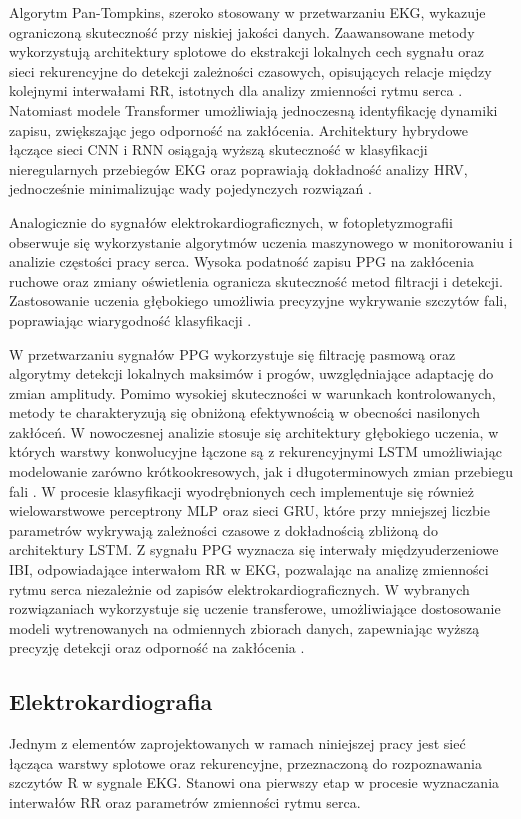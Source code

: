 \documentclass[journal]{IEEEtran}
\begin{document}
Algorytm Pan-Tompkins, szeroko stosowany w przetwarzaniu EKG, wykazuje ograniczoną skuteczność przy niskiej jakości danych. Zaawansowane metody wykorzystują architektury splotowe do ekstrakcji lokalnych cech sygnału oraz sieci rekurencyjne do detekcji zależności czasowych, opisujących relacje między kolejnymi interwałami RR, istotnych dla analizy zmienności rytmu serca \cite{2}. Natomiast modele Transformer umożliwiają jednoczesną identyfikację dynamiki zapisu, zwiększając jego odporność na zakłócenia.  Architektury hybrydowe łączące sieci CNN i RNN osiągają wyższą skuteczność w klasyfikacji nieregularnych przebiegów EKG oraz poprawiają dokładność analizy HRV, jednocześnie minimalizując wady pojedynczych rozwiązań \cite{3}.

\newpage
Analogicznie do sygnałów elektrokardiograficznych, w fotopletyzmografii obserwuje się wykorzystanie algorytmów uczenia maszynowego w monitorowaniu i analizie częstości pracy serca. Wysoka podatność zapisu PPG na zakłócenia ruchowe oraz zmiany oświetlenia ogranicza skuteczność metod filtracji i detekcji. Zastosowanie uczenia głębokiego umożliwia precyzyjne wykrywanie szczytów fali, poprawiając wiarygodność klasyfikacji \cite{4}.

W przetwarzaniu sygnałów PPG wykorzystuje się filtrację pasmową oraz algorytmy detekcji lokalnych maksimów i progów, uwzględniające adaptację do zmian amplitudy. Pomimo wysokiej skuteczności w warunkach kontrolowanych, metody te charakteryzują się obniżoną efektywnością w obecności nasilonych zakłóceń. W nowoczesnej analizie stosuje się architektury głębokiego uczenia, w których warstwy konwolucyjne łączone są z rekurencyjnymi LSTM umożliwiając modelowanie zarówno krótkookresowych, jak i długoterminowych zmian przebiegu fali \cite{5}. W procesie klasyfikacji wyodrębnionych cech implementuje się również wielowarstwowe perceptrony MLP oraz sieci GRU, które przy mniejszej liczbie parametrów wykrywają zależności czasowe z dokładnością zbliżoną do architektury LSTM.
Z sygnału PPG wyznacza się interwały międzyuderzeniowe IBI, odpowiadające interwałom RR w EKG, pozwalając na analizę zmienności rytmu serca niezależnie od zapisów elektrokardiograficznych. W wybranych rozwiązaniach wykorzystuje się uczenie transferowe, umożliwiające dostosowanie modeli wytrenowanych na odmiennych zbiorach danych, zapewniając wyższą precyzję detekcji oraz odporność na zakłócenia \cite{6}.


\subsection{Elektrokardiografia}
Jednym z elementów zaprojektowanych w ramach niniejszej pracy jest sieć łącząca warstwy splotowe oraz rekurencyjne, przeznaczoną do rozpoznawania szczytów R w sygnale EKG. Stanowi ona pierwszy etap w procesie wyznaczania interwałów RR oraz parametrów zmienności rytmu serca.
\end{document}
